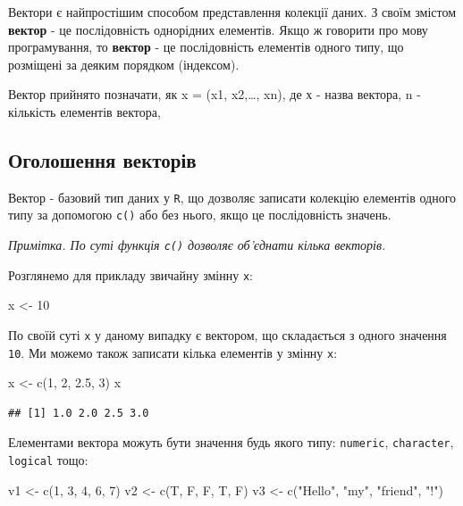 \documentclass[
]{book}
\newenvironment{Shaded}{\begin{snugshade}}{\end{snugshade}}
\newcommand{\DecValTok}[1]{\textcolor[rgb]{0.00,0.00,0.81}{#1}}
\newcommand{\FloatTok}[1]{\textcolor[rgb]{0.00,0.00,0.81}{#1}}
\newcommand{\FunctionTok}[1]{\textcolor[rgb]{0.00,0.00,0.00}{#1}}
\newcommand{\NormalTok}[1]{#1}
\newcommand{\OtherTok}[1]{\textcolor[rgb]{0.56,0.35,0.01}{#1}}
\newcommand{\StringTok}[1]{\textcolor[rgb]{0.31,0.60,0.02}{#1}}
\begin{document}
Вектори є найпростішим способом представлення колекції даних. З своїм змістом \textbf{вектор} - це послідовність однорідних елементів. Якщо ж говорити про мову програмування, то \textbf{вектор} - це послідовність елементів одного типу, що розміщені за деяким порядком (індексом).

Вектор прийнято позначати, як x = (x1, x2,\ldots, xn), де х - назва вектора, n - кількість елементів вектора,

\hypertarget{chapter322}{%
\subsection{Оголошення векторів}\label{chapter322}}

Вектор - базовий тип даних у \texttt{R}, що дозволяє записати колекцію елементів одного типу за допомогою \texttt{c()} або без нього, якщо це послідовність значень.

\emph{Примітка. По суті функція \texttt{c()} дозволяє об'єднати кілька векторів.}

Розглянемо для прикладу звичайну змінну \texttt{x}:

\begin{Shaded}
\begin{Highlighting}[]
\NormalTok{x }\OtherTok{\textless{}{-}} \DecValTok{10}
\end{Highlighting}
\end{Shaded}

По своїй суті \texttt{x} у даному випадку є вектором, що складається з одного значення \texttt{10}. Ми можемо також записати кілька елементів у змінну \texttt{x}:

\begin{Shaded}
\begin{Highlighting}[]
\NormalTok{x }\OtherTok{\textless{}{-}} \FunctionTok{c}\NormalTok{(}\DecValTok{1}\NormalTok{, }\DecValTok{2}\NormalTok{, }\FloatTok{2.5}\NormalTok{, }\DecValTok{3}\NormalTok{)}
\NormalTok{x}
\end{Highlighting}
\end{Shaded}

\begin{verbatim}
## [1] 1.0 2.0 2.5 3.0
\end{verbatim}

Елементами вектора можуть бути значення будь якого типу: \texttt{numeric}, \texttt{character}, \texttt{logical} тощо:

\begin{Shaded}
\begin{Highlighting}[]
\NormalTok{v1 }\OtherTok{\textless{}{-}} \FunctionTok{c}\NormalTok{(}\DecValTok{1}\NormalTok{, }\DecValTok{3}\NormalTok{, }\DecValTok{4}\NormalTok{, }\DecValTok{6}\NormalTok{, }\DecValTok{7}\NormalTok{)}
\NormalTok{v2 }\OtherTok{\textless{}{-}} \FunctionTok{c}\NormalTok{(T, F, F, T, F)}
\NormalTok{v3 }\OtherTok{\textless{}{-}} \FunctionTok{c}\NormalTok{(}\StringTok{"Hello"}\NormalTok{, }\StringTok{"my"}\NormalTok{, }\StringTok{"friend"}\NormalTok{, }\StringTok{"!"}\NormalTok{)}
\end{Highlighting}
\end{Shaded}
\end{document}
